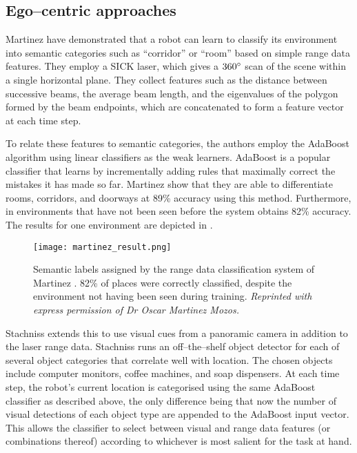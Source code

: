 \subsection{Ego--centric approaches}
Martinez \etal \cite{Mozos05} have demonstrated that a robot can learn
to classify its environment into semantic categories such as
``corridor'' or ``room'' based on simple range data features. They
employ a SICK laser, which gives a $360\degrees$ scan of the scene
within a single horizontal plane. They collect features such as the
distance between successive beams, the average beam length, and the
eigenvalues of the polygon formed by the beam endpoints, which are
concatenated to form a feature vector at each time step.

To relate these features to semantic categories, the authors employ
the AdaBoost algorithm \cite{Schapire98} using linear classifiers as
the weak learners. AdaBoost is a popular classifier that learns by
incrementally adding rules that maximally correct the mistakes it has
made so far. Martinez \etal show that they are able to differentiate
rooms, corridors, and doorways at 89\% accuracy using this
method. Furthermore, in environments that have not been seen before
the system obtains 82\% accuracy. The results for one environment are
depicted in .

\begin{figure}[tb]
  \centering
  \texttt{[image: martinez\_result.png]}
  \caption{Semantic labels assigned by the range data classification
    system of Martinez \etal \cite{Mozos05}. 82\% of places were
    correctly classified, despite the environment not having been seen
    during training.
    \textit{Reprinted with express permission of Dr Oscar Martinez Mozos.}
    }
  \label{fig:martinez-result}
\end{figure}

Stachniss \etal \cite{Stachniss05} extends this to use visual cues
from a panoramic camera in addition to the laser range data. Stachniss
runs an off--the--shelf object detector for each of several object
categories that correlate well with location. The chosen objects
include computer monitors, coffee machines, and soap dispensers. At
each time step, the robot's current location is categorised using the
same AdaBoost classifier as described above, the only difference being
that now the number of visual detections of each object type are
appended to the AdaBoost input vector. This allows the classifier to
select between visual and range data features (or combinations
thereof) according to whichever is most salient for the task at hand.

